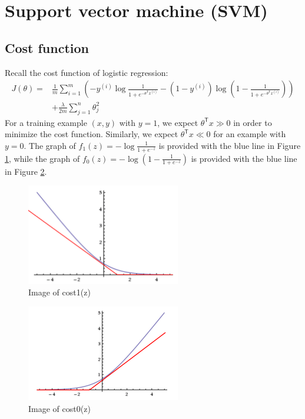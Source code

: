 \ifx\PREAMBLE\undefined


\fi
\section{Support vector machine (SVM)}
\subsection{Cost function}
Recall the cost function of logistic regression:
\begin{equation}
\begin{split}
J(\theta) = &\frac{1}{m}\sum\limits_{i=1}^{m}\left(-y^{(i)}\log\frac{1}{1+e^{-\theta^{\mathsf T}x^{(i)}}} - (1-y^{(i)})\log\left(1-\frac{1}{1+e^{-\theta^{\mathsf T}x^{(i)}}}\right)\right) \\
&+ \frac{\lambda}{2m}\sum\limits_{j=1}^{n}\theta_j^{2}
\end{split}\end{equation}
For a training example $(x,y)$ with $y=1$, we expect $\theta^{\mathsf T}x\gg 0$ in order to minimize the cost function. Similarly, we expect $\theta^{\mathsf T}x\ll 0$ for an example with $y=0$. The graph of $f_1(z) = -\log\frac{1}{1+e^{-z}}$ is provided with the blue line in Figure \ref{cost1}, while the graph of $f_0(z) = -\log\left(1-\frac{1}{1+e^{-z}}\right)$ is provided with the blue line in Figure \ref{cost0}.
\begin{figure}[H]
\centering
\includegraphics[width = 0.6\textwidth]{cost1.jpg}
\caption{Image of cost1(z)}\label{cost1}
\end{figure}
\begin{figure}[H]
\centering
\includegraphics[width = 0.6\textwidth]{cost0.jpg}
\caption{Image of cost0(z)}\label{cost0}
\end{figure}
